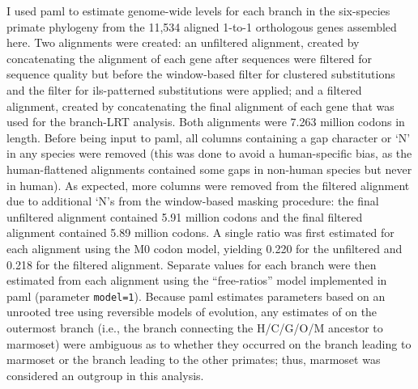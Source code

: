 I used \ac{paml} to estimate genome-wide \dnds levels for each branch
in the six-species primate phylogeny from the 11,534 aligned 1-to-1
orthologous genes assembled here. Two alignments were created: an
unfiltered alignment, created by concatenating the alignment of each
gene after sequences were filtered for sequence quality but before the
window-based filter for clustered \nsyn substitutions and the filter
for \ac{ils}-patterned substitutions were applied; and a filtered
alignment, created by concatenating the final alignment of each gene
that was used for the branch-LRT analysis. Both alignments were 7.263
million codons in length. Before being input to \ac{paml}, all columns
containing a gap character or `N' in any species were removed (this
was done to avoid a human-specific bias, as the human-flattened
alignments contained some gaps in non-human species but never in
human). As expected, more columns were removed from the filtered
alignment due to additional `N's from the window-based masking
procedure: the final unfiltered alignment contained 5.91 million
codons and the final filtered alignment contained 5.89 million
codons. A single \dnds ratio was first estimated for each alignment
using the M0 codon model, yielding 0.220 for the unfiltered and 0.218
for the filtered alignment. Separate \dnds values for each branch were
then estimated from each alignment using the ``free-ratios'' model
implemented in \ac{paml} (parameter \texttt{model=1}). Because
\ac{paml} estimates parameters based on an unrooted tree using
reversible models of evolution, any estimates of \dnds on the
outermost branch (i.e., the branch connecting the H/C/G/O/M ancestor
to marmoset) were ambiguous as to whether they occurred on the branch
leading to marmoset or the branch leading to the other primates; thus,
marmoset was considered an outgroup in this analysis.

